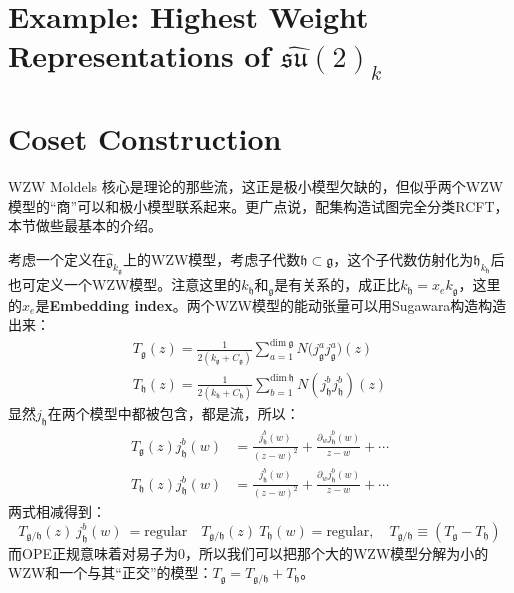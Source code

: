 \section{Example: Highest Weight Representations of $\widehat{\mathfrak{su}}(2)_{k}$ }
\section{Coset Construction}
WZW Moldels 核心是理论的那些流，这正是极小模型欠缺的，但似乎两个WZW模型的“商”可以和极小模型联系起来。更广点说，配集构造试图完全分类RCFT，本节做些最基本的介绍。

考虑一个定义在$\hat{\mathfrak{g}}_{k_{\mathfrak{g}}}$上的WZW模型，考虑子代数$\mathfrak{h}\subset{\mathfrak{g}}$，这个子代数仿射化为$\hat{\mathfrak{h}}_{k_{\mathfrak{h}}}$后也可定义一个WZW模型。注意这里的$k_{\mathfrak{h}}$和$_{\mathfrak{g}}$是有关系的，成正比$k_{\mathfrak{h}}=x_ek_{\mathfrak{g}}$，这里的$x_e$是\textbf{Embedding index}。两个WZW模型的能动张量可以用Sugawara构造构造出来：
\begin{equation}
	\begin{gathered}
		T_{\mathfrak{g}}(z) =\frac1{2\left(k_{\mathfrak{g}}+C_{\mathfrak{g}}\right)}\sum_{a=1}^{\mathrm{dim~}\mathfrak{g}}N\bigl(j_{\mathfrak{g}}^{a}j_{\mathfrak{g}}^{a}\bigr)(z) \\
		T_{\mathfrak{h}}(z) =\frac1{2\left(k_{\mathfrak{h}}+C_{\mathfrak{h}}\right)}\sum_{b=1}^{\mathrm{dim~}\mathfrak{h}}N{\left(j_{\mathfrak{h}}^{b}j_{\mathfrak{h}}^{b}\right)}(z) 
	\end{gathered}
\end{equation}
显然$j_\mathfrak{h}$在两个模型中都被包含，都是流，所以：
\begin{equation}
	\begin{aligned}T_{\mathfrak{g}}(z)j_{\mathfrak{h}}^b(w)&=\frac{j_{\mathfrak{h}}^b(w)}{(z-w)^2}+\frac{\partial_wj_{\mathfrak{h}}^b(w)}{z-w}+\cdots\\T_{\mathfrak{h}}(z)j_{\mathfrak{h}}^b(w)&=\frac{j_{\mathfrak{h}}^b(w)}{(z-w)^2}+\frac{\partial_wj_{\mathfrak{h}}^b(w)}{z-w}+\cdots\end{aligned}
\end{equation}
两式相减得到：
\begin{equation}
	T_{\mathfrak{g}/\mathfrak{h}}(z)~j_{\mathfrak{h}}^{b}(w)~=\text{regular}\quad T_{\mathfrak{g}/\mathfrak{h}}(z)~T_{\mathfrak{h}}(w)=\text{regular},\quad T_{\mathfrak{g}/\mathfrak{h}}\equiv\left(T_{\mathfrak{g}}-T_{\mathfrak{h}}\right)
\end{equation}
而OPE正规意味着对易子为0，所以我们可以把那个大的WZW模型分解为小的WZW和一个与其“正交”的模型：$T_\mathfrak{g}=T_{\mathfrak{g}/\mathfrak{h}}+T_\mathfrak{h}$。
